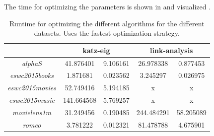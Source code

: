 The time for optimizing the parameters is shown in  and visualized .

\begin{table}[h!]
    \centering
    \begin{tabular}{| c | c | c | c | c |}
        \hline
        \textbf{}               & \multicolumn{2}{c|}{\textbf{katz-eig}} & \multicolumn{2}{c|}{\textbf{link-analysis}} \\ \hline
        \textit{alphaS}         & 41.876401     & 9.106161         & 26.978338     & 0.877453      \\ \hline
        \textit{eswc2015books}  & 1.871681      & 0.023562         & 3.245297      & 0.026975      \\ \hline
        \textit{eswc2015movies} & 52.749416     & 5.194185         & x             & x             \\ \hline
        \textit{eswc2015music}  & 141.664568    & 5.769257         & x             & x             \\ \hline
        \textit{movielens1m}    & 31.249456     & 0.190485         & 244.484291    & 58.205089     \\ \hline
        \textit{romeo}          & 3.781222      & 0.012321         & 81.478788     & 4.675901      \\ \hline
    \end{tabular}
    \caption{Runtime for optimizing the different algorithms for the different datasets. Uses the fastest optimization strategy.}
    \label{tab:alg_opt_time}
\end{table}

